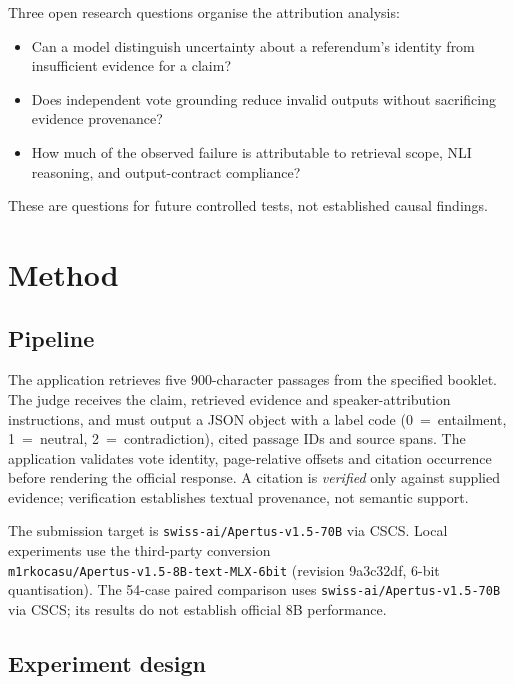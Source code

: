 \documentclass[10pt,a4paper]{article}
\begin{document}
Three open research questions organise the attribution analysis:
\begin{itemize}
\item[\textbf{RQ1.}] Can a model distinguish uncertainty about a referendum's identity from insufficient evidence for a claim?
\item[\textbf{RQ2.}] Does independent vote grounding reduce invalid outputs without sacrificing evidence provenance?
\item[\textbf{RQ3.}] How much of the observed failure is attributable to retrieval scope, NLI reasoning, and output-contract compliance?
\end{itemize}
These are questions for future controlled tests, not established causal findings.

\section{Method}

\subsection{Pipeline}

The application retrieves five 900-character passages from the specified booklet. The judge receives the claim, retrieved evidence and speaker-attribution instructions, and must output a JSON object with a label code (0~=~entailment, 1~=~neutral, 2~=~contradiction), cited passage IDs and source spans. The application validates vote identity, page-relative offsets and citation occurrence before rendering the official response. A citation is \emph{verified} only against supplied evidence; verification establishes textual provenance, not semantic support.

The submission target is \texttt{swiss-ai/Apertus-v1.5-70B} via CSCS. Local experiments use the third-party conversion\\
\texttt{m1rkocasu/Apertus-v1.5-8B-text-MLX-6bit} (revision 9a3c32df, 6-bit quantisation). The 54-case paired comparison uses \texttt{swiss-ai/Apertus-v1.5-70B} via CSCS; its results do not establish official 8B performance.

\subsection{Experiment design}
\end{document}
